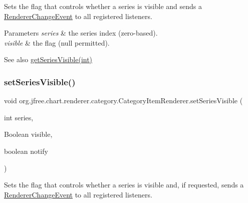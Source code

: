 Sets the flag that controls whether a series is visible and sends a \mbox{\hyperlink{}{Renderer\+Change\+Event}} to all registered listeners.


\begin{DoxyParams}{Parameters}
{\em series} & the series index (zero-\/based). \\
\hline
{\em visible} & the flag ({\ttfamily null} permitted).\\
\hline
\end{DoxyParams}
\begin{DoxySeeAlso}{See also}
\mbox{\hyperlink{interfaceorg_1_1jfree_1_1chart_1_1renderer_1_1category_1_1_category_item_renderer_a1d3a9d0a19083c8c15bfa752455aa924}{get\+Series\+Visible(int)}} 
\end{DoxySeeAlso}
\mbox{\label{interfaceorg_1_1jfree_1_1chart_1_1renderer_1_1category_1_1_category_item_renderer_acbda5cc4a2a6b7ccc98875c2a7c20713}} 
\subsubsection{\texorpdfstring{set\+Series\+Visible()}{setSeriesVisible()}\hspace{0.1cm}{\footnotesize\ttfamily [4/4]}}
{\footnotesize\ttfamily void org.\+jfree.\+chart.\+renderer.\+category.\+Category\+Item\+Renderer.\+set\+Series\+Visible (\begin{DoxyParamCaption}\item[{int}]{series,  }\item[{Boolean}]{visible,  }\item[{boolean}]{notify }\end{DoxyParamCaption})}

Sets the flag that controls whether a series is visible and, if requested, sends a \mbox{\hyperlink{}{Renderer\+Change\+Event}} to all registered listeners.


